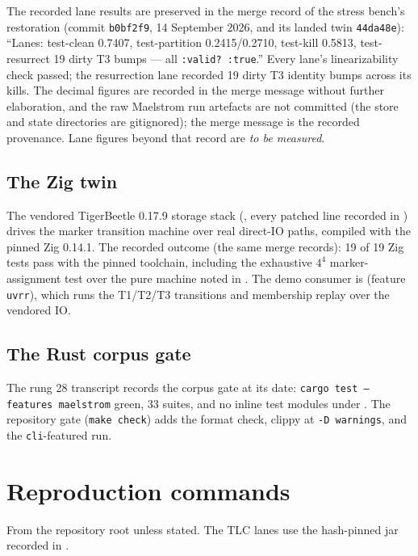 \documentclass[10pt,journal,letterpaper]{IEEEtran}
\newcommand{\code}[1]{\texttt{#1}}
\newcommand{\tobemeasured}{\emph{to be measured}}
\begin{document}
The recorded lane results are preserved in the merge record of the stress
bench's restoration (commit \code{b0bf2f9}, 14 September 2026, and its
landed twin \code{44da48e}): ``Lanes: test-clean 0.7407, test-partition
0.2415/0.2710, test-kill 0.5813, test-resurrect 19 dirty T3 bumps --- all
\code{:valid? :true}.'' Every lane's linearizability check passed; the
resurrection lane recorded 19 dirty T3 identity bumps across its kills. The
decimal figures are recorded in the merge message without further
elaboration, and the raw Maelstrom run artefacts are not committed (the
store and state directories are gitignored); the merge message is the
recorded provenance. Lane figures beyond that record are \tobemeasured.

\subsection{The Zig twin}
The vendored TigerBeetle 0.17.9 storage stack (, every patched
line recorded in ) drives the marker transition
machine over real direct-IO paths, compiled with the pinned Zig 0.14.1. The
recorded outcome (the same merge records): 19 of 19 Zig tests pass with the
pinned toolchain, including the exhaustive $4^4$ marker-assignment test over
the pure machine noted in . The demo consumer is
 (feature \code{uvrr}), which runs the
T1/T2/T3 transitions and membership replay over the vendored IO.

\subsection{The Rust corpus gate}
The rung 28 transcript records the corpus gate at its date:
\code{cargo test --features maelstrom} green, 33 suites, and no inline test
modules under . The repository gate (\code{make check}) adds the
format check, clippy at \code{-D warnings}, and the \code{cli}-featured run.

\section{Reproduction commands}\label{app:repro}
From the repository root unless stated. The TLC lanes use the hash-pinned
jar recorded in .
\end{document}
